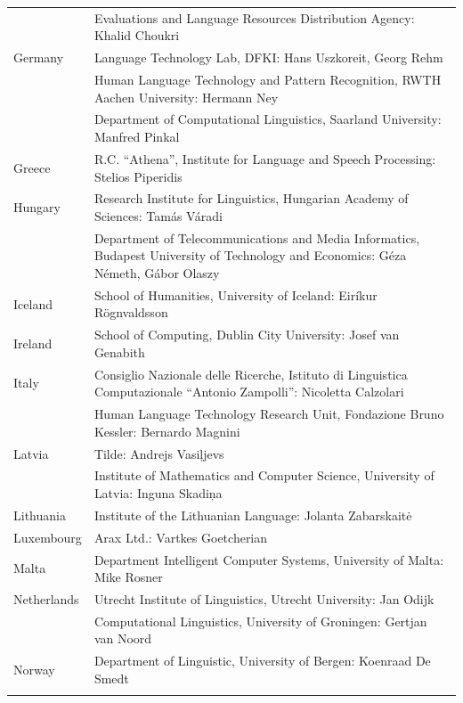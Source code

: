 \documentclass[]{../../metanetpaper}
\begin{document}
\begin{longtable}{@{}lp{137mm}@{}}
& Evaluations and Language Resources Distribution Agency: Khalid Choukri\\ \addlinespace 
Germany & Language Technology Lab, DFKI: Hans Uszkoreit, Georg Rehm\\ \addlinespace 
& Human Language Technology and Pattern Recognition, RWTH Aachen University: Hermann Ney \\ \addlinespace 
& Department of Computational Linguistics, Saarland University: Manfred Pinkal\\ \addlinespace 
Greece & R.C. “Athena”, Institute for Language and Speech Processing: Stelios Piperidis\\ \addlinespace
Hungary & Research Institute for Linguistics, Hungarian Academy of Sciences: Tamás Váradi\\  \addlinespace
& Department of Telecommunications and Media Informatics, Budapest University of Technology and Economics: Géza Németh, Gábor Olaszy\\ \addlinespace
Iceland & School of Humanities, University of Iceland: Eiríkur Rögnvaldsson\\ \addlinespace
Ireland & School of Computing, Dublin City University: Josef van Genabith\\ \addlinespace
Italy & Consiglio Nazionale delle Ricerche, Istituto di Linguistica Computazionale “Antonio Zampolli”: \newline Nicoletta Calzolari\\ \addlinespace
& Human Language Technology Research Unit, Fondazione Bruno Kessler:  Bernardo Magnini\\ \addlinespace 
Latvia & Tilde: Andrejs Vasiļjevs\\ \addlinespace  
& Institute of Mathematics and Computer Science, University of Latvia: Inguna Skadiņa\\ \addlinespace
Lithuania & Institute of the Lithuanian Language: Jolanta Zabarskaitė\\ \addlinespace
Luxembourg & Arax Ltd.: Vartkes Goetcherian\\ \addlinespace
Malta & Department Intelligent Computer Systems, University of Malta: Mike Rosner\\ \addlinespace
Netherlands & Utrecht Institute of Linguistics, Utrecht University: Jan Odijk\\ \addlinespace  
& Computational Linguistics, University of Groningen: Gertjan van Noord\\ \addlinespace
Norway & Department of Linguistic, University of Bergen: Koenraad De Smedt\\ \addlinespace  

\end{longtable}
\end{document}
